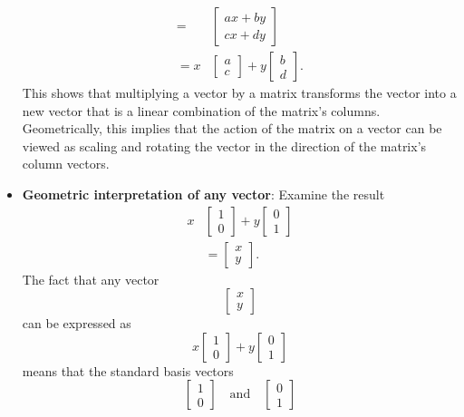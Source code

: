 \documentclass{report}
\begin{document}
\begin{itemize}
\begin{align*}
            = &\begin{bmatrix} ax + by \\ cx + dy \end{bmatrix} \\
            = x&\begin{bmatrix} a \\ c\end{bmatrix} + y\begin{bmatrix} b \\ d  \end{bmatrix}
        .\end{align*}
        \bigbreak \noindent 
        This shows that multiplying a vector by a matrix transforms the vector into a new vector that is a linear combination of the matrix's columns. Geometrically, this implies that the action of the matrix on a vector can be viewed as scaling and rotating the vector in the direction of the matrix's column vectors.
        \bigbreak \noindent 
    \item \textbf{Geometric interpretation of any vector}: Examine the result
        \begin{align*}
            x &\begin{bmatrix} 1 \\ 0 \end{bmatrix} + y \begin{bmatrix} 0 \\  1 \end{bmatrix} \\
            &= \begin{bmatrix} x \\ y\end{bmatrix}
        .\end{align*}
        \bigbreak \noindent 
        The fact that any vector 
        \[
            \begin{bmatrix} x \\ y \end{bmatrix}
        \]
        can be expressed as 
        \[
            x \begin{bmatrix} 1 \\ 0 \end{bmatrix} + y \begin{bmatrix} 0 \\ 1 \end{bmatrix}
        \]
        means that the standard basis vectors 
        \[
            \begin{bmatrix} 1 \\ 0 \end{bmatrix} \quad \text{and} \quad \begin{bmatrix} 0 \\ 1 \end{bmatrix}
\]
\end{itemize}
\end{document}
